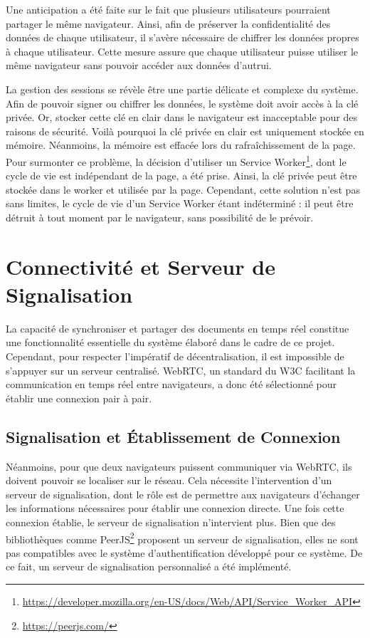 Une anticipation a été faite sur le fait que plusieurs utilisateurs pourraient partager le même navigateur. Ainsi, afin de préserver la confidentialité des données de chaque utilisateur, il s'avère nécessaire de chiffrer les données propres à chaque utilisateur. Cette mesure assure que chaque utilisateur puisse utiliser le même navigateur sans pouvoir accéder aux données d'autrui.

La gestion des sessions se révèle être une partie délicate et complexe du système. Afin de pouvoir signer ou chiffrer les données, le système doit avoir accès à la clé privée. Or, stocker cette clé en clair dans le navigateur est inacceptable pour des raisons de sécurité. Voilà pourquoi la clé privée en clair est uniquement stockée en mémoire. Néanmoins, la mémoire est effacée lors du rafraîchissement de la page. Pour surmonter ce problème, la décision d'utiliser un Service Worker\footnote{\url{https://developer.mozilla.org/en-US/docs/Web/API/Service_Worker_API}}, dont le cycle de vie est indépendant de la page, a été prise. Ainsi, la clé privée peut être stockée dans le worker et utilisée par la page. Cependant, cette solution n'est pas sans limites, le cycle de vie d'un Service Worker étant indéterminé : il peut être détruit à tout moment par le navigateur, sans possibilité de le prévoir.

\section{Connectivité et Serveur de Signalisation}

La capacité de synchroniser et partager des documents en temps réel constitue une fonctionnalité essentielle du système élaboré dans le cadre de ce projet. Cependant, pour respecter l'impératif de décentralisation, il est impossible de s'appuyer sur un serveur centralisé. \gls{WebRTC}, un standard du \gls{W3C} facilitant la communication en temps réel entre navigateurs, a donc été sélectionné pour établir une connexion pair à pair.

\subsection{Signalisation et Établissement de Connexion}

Néanmoins, pour que deux navigateurs puissent communiquer via \gls{WebRTC}, ils doivent pouvoir se localiser sur le réseau. Cela nécessite l'intervention d'un serveur de signalisation, dont le rôle est de permettre aux navigateurs d'échanger les informations nécessaires pour établir une connexion directe. Une fois cette connexion établie, le serveur de signalisation n'intervient plus. Bien que des bibliothèques comme PeerJS\footnote{\url{https://peerjs.com/}} proposent un serveur de signalisation, elles ne sont pas compatibles avec le système d'authentification développé pour ce système. De ce fait, un serveur de signalisation personnalisé a été implémenté.

